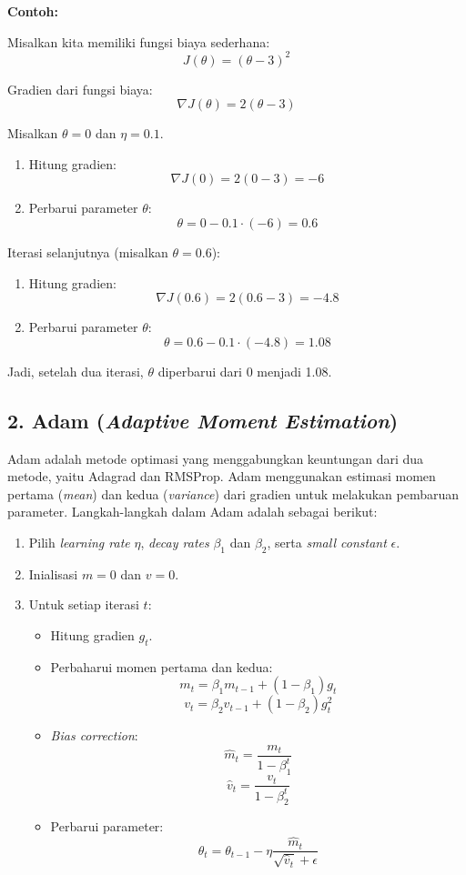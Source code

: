 \textbf{Contoh:}

Misalkan kita memiliki fungsi biaya sederhana:
\[ 
J(\theta) = (\theta - 3)^2 
\]

Gradien dari fungsi biaya:
\[ 
\nabla J(\theta) = 2(\theta - 3) 
\]

Misalkan \(\theta = 0\) dan \(\eta = 0.1\).

\begin{enumerate}
    \item Hitung gradien:
    \[
    \nabla J(0) = 2(0 - 3) = -6
    \]

    \item Perbarui parameter \(\theta\):
    \[
    \theta = 0 - 0.1 \cdot (-6) = 0.6
    \]
\end{enumerate}

Iterasi selanjutnya (misalkan \(\theta = 0.6\)):

\begin{enumerate}
    \item Hitung gradien:
    \[
    \nabla J(0.6) = 2(0.6 - 3) = -4.8
    \]

    \item Perbarui parameter \(\theta\):
    \[
    \theta = 0.6 - 0.1 \cdot (-4.8) = 1.08
    \]
\end{enumerate}

Jadi, setelah dua iterasi, \(\theta\) diperbarui dari 0 menjadi 1.08.

\subsection*{2. Adam (\textit{Adaptive Moment Estimation})}

Adam adalah metode optimasi yang menggabungkan keuntungan dari dua metode, yaitu Adagrad dan RMSProp. Adam menggunakan estimasi momen pertama (\textit{mean}) dan kedua (\textit{variance}) dari gradien untuk melakukan pembaruan parameter. Langkah-langkah dalam Adam adalah sebagai berikut:

\begin{enumerate}
    \item Pilih \textit{learning rate} \(\eta\), \textit{decay rates} \(\beta_1\) dan \(\beta_2\), serta \textit{small constant} \(\epsilon\).
    \item Inialisasi \(m = 0\) dan \(v = 0\).
    \item Untuk setiap iterasi \(t\):
    \begin{itemize}
        \item Hitung gradien \(g_t\).
        \item Perbaharui momen pertama dan kedua:
        \[
        m_t = \beta_1 m_{t-1} + (1 - \beta_1) g_t
        \]
        \[
        v_t = \beta_2 v_{t-1} + (1 - \beta_2) g_t^2
        \]
        \item \textit{Bias correction}:
        \[
        \hat{m}_t = \frac{m_t}{1 - \beta_1^t}
        \]
        \[
        \hat{v}_t = \frac{v_t}{1 - \beta_2^t}
        \]
        \item Perbarui parameter:
        \[
        \theta_t = \theta_{t-1} - \eta \frac{\hat{m}_t}{\sqrt{\hat{v}_t} + \epsilon}
        \]
    \end{itemize}
\end{enumerate}

